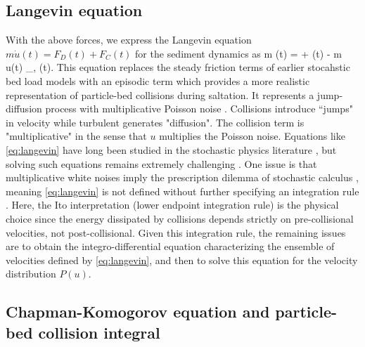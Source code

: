 \subsection{Langevin equation}

With the above forces, we express the Langevin equation $m\dot{u}(t) = F_D(t) + F_C(t)$ for the sediment dynamics as
\be m (t) = \Gamma + \eta(t) - m u(t) \xi_{\nu, \ve}(t). \label{eq:langevin} \ee
This equation replaces the steady friction terms of earlier stocahstic bed load models with an episodic term which provides a more realistic representation of particle-bed collisions during saltation.
It represents a jump-diffusion process \citep{Daly2006} with multiplicative Poisson noise \citep{Dubkov2016,Denisov2009}. 
Collisions introduce ``jumps" in velocity while turbulent generates "diffusion".
The collision term is "multiplicative" in the sense that $u$ multiplies the Poisson noise.
Equations like \ref{eq:langevin} have long been studied in the stochastic physics literature \citep{Hanggi1978,vandenBroek1983}, but solving such equations remains extremely challenging \citep{Luczka1995,Daly2010,Mau2014,Dubkov2019}.
One issue is that multiplicative white noises imply the prescription dilemma of stochastic calculus \citep{Risken1984,Gardiner1983}, meaning \ref{eq:langevin} is not defined without further specifying an integration rule \citep{Suweiss2011}.
Here, the Ito interpretation (lower endpoint integration rule) is the physical choice since the energy dissipated by collisions depends strictly on pre-collisional velocities, not post-collisional.
Given this integration rule, the remaining issues are to obtain the integro-differential equation characterizing the ensemble of velocities defined by \ref{eq:langevin}, and then to solve this equation for the velocity distribution $P(u)$.

\subsection{Chapman-Komogorov equation and particle-bed collision integral}

